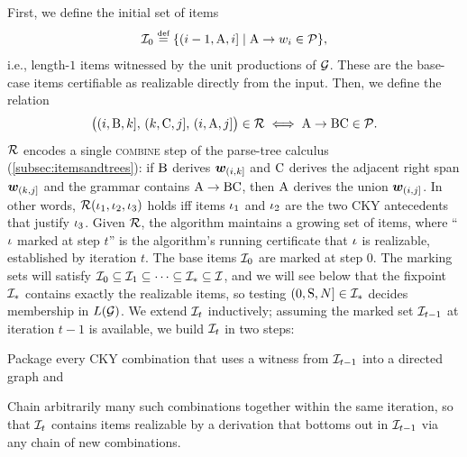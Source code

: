 \documentclass{article}
\begin{document}
First, we define the initial set of items
\begin{equation}
    \items_0 \defeq \{(\idxi-1, \NTA, \idxi] \mid \production{\NTA}{\sym_\idxi} \in \rules\},
\end{equation}
i.e., length-$1$ items witnessed by the unit productions of ${{ \mathcal{G}}}$. 
These are the base-case items certifiable as realizable directly from the input.
Then, we define the relation
\begin{equation}
    \bigl(({{ i}}, {{ \mathrm{B}}}, {{ k}}],\, ({{ k}}, {{ \mathrm{C}}}, {{ j}}],\, ({{ i}}, {{ \mathrm{A}}}, {{ j}}]\bigr) \in {{{ \mathcal{R}}}} \iff {{ {{ \mathrm{A}}}\rightarrow {{ \mathrm{B}}}{{ \mathrm{C}}}}} \in {{ \mathcal{P}}}.
\end{equation}
${{{ \mathcal{R}}}}$ encodes a single \textsc{combine} step of the parse-tree calculus (\cref{subsec:itemsandtrees}): if ${{ \mathrm{B}}}$ derives ${{\boldsymbol{w}}}_{({{ i}}, {{ k}}]}$ and ${{ \mathrm{C}}}$ derives the adjacent right span ${{\boldsymbol{w}}}_{({{ k}}, {{ j}}]}$ and the grammar contains ${{ {{ \mathrm{A}}} \rightarrow {{ \mathrm{B}}}{{ \mathrm{C}}}}}$, then ${{ \mathrm{A}}}$ derives the union ${{\boldsymbol{w}}}_{({{ i}}, {{ j}}]}$.
In other words, ${{{ \mathcal{R}}}}({{ \iota}}_1, {{ \iota}}_2, {{ \iota}}_3)$ holds iff items ${{ \iota}}_1$ and ${{ \iota}}_2$ are the two CKY antecedents that justify ${{ \iota}}_3$.
Given ${{{ \mathcal{R}}}}$, the algorithm maintains a growing set of  items, where ``${{ \iota}}$ marked at step $t$'' is the algorithm's running certificate that ${{ \iota}}$ is realizable, established by iteration $t$.
The base items ${{\mathcal{I}}}_0$ are marked at step $0$.
The marking sets will satisfy ${{\mathcal{I}}}_0 \subseteq {{\mathcal{I}}}_1 \subseteq \cdots \subseteq {{\mathcal{I}}}_* \subseteq {{\mathcal{I}}}$, and we will see below that the fixpoint ${{\mathcal{I}}}_*$ contains exactly the realizable items, so testing $(0, {{ \mathrm{S}}}, {{ N}}] \in {{\mathcal{I}}}_*$ decides membership in ${L}({{ \mathcal{G}}})$.
We extend ${{{ \mathcal{I}}}}_t$ inductively; assuming the marked set ${{\mathcal{I}}}_{t-1}$ at iteration $t-1$ is available, we build ${{\mathcal{I}}}_t$ in two steps:
\begin{enumerate*}[label=(\textit{\arabic*})]
    \item Package every CKY combination that uses a witness from ${{\mathcal{I}}}_{t-1}$ into a directed graph and
    \item Chain arbitrarily many such combinations together within the same iteration, so that ${{\mathcal{I}}}_t$ contains items realizable by a derivation that bottoms out in ${{\mathcal{I}}}_{t-1}$ via any chain of new combinations.
\end{enumerate*}
\end{document}
